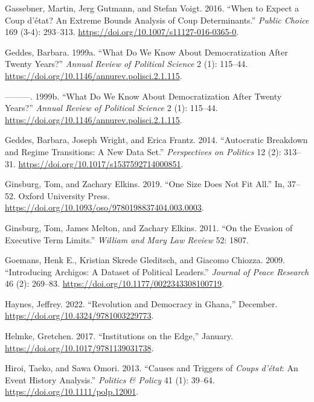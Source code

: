 \documentclass[
  12pt,
]{report}
\newlength{\cslhangindent}
\newenvironment{CSLReferences}[2] %
 {\begin{list}{}{%
  \setlength{\itemindent}{0pt}
  \setlength{\leftmargin}{0pt}
  \setlength{\parsep}{0pt}
  \ifodd #1
   \setlength{\leftmargin}{\cslhangindent}
   \setlength{\itemindent}{-1\cslhangindent}
  \fi
  \setlength{\itemsep}{#2\baselineskip}}}
 {\end{list}}
\begin{document}
\begin{CSLReferences}{1}{0}
Gassebner, Martin, Jerg Gutmann, and Stefan Voigt. 2016. {``When to
Expect a Coup d{'}état? An Extreme Bounds Analysis of Coup
Determinants.''} \emph{Public Choice} 169 (3-4): 293--313.
\url{https://doi.org/10.1007/s11127-016-0365-0}.

Geddes, Barbara. 1999a. {``What Do We Know About Democratization After
Twenty Years?''} \emph{Annual Review of Political Science} 2 (1):
115--44. \url{https://doi.org/10.1146/annurev.polisci.2.1.115}.

---------. 1999b. {``What Do We Know About Democratization After Twenty
Years?''} \emph{Annual Review of Political Science} 2 (1): 115--44.
\url{https://doi.org/10.1146/annurev.polisci.2.1.115}.

Geddes, Barbara, Joseph Wright, and Erica Frantz. 2014. {``Autocratic
Breakdown and Regime Transitions: A New Data Set.''} \emph{Perspectives
on Politics} 12 (2): 313--31.
\url{https://doi.org/10.1017/s1537592714000851}.

Ginsburg, Tom, and Zachary Elkins. 2019. {``One Size Does Not Fit
All.''} In, 37--52. Oxford University Press.
\url{https://doi.org/10.1093/oso/9780198837404.003.0003}.

Ginsburg, Tom, James Melton, and Zachary Elkins. 2011. {``On the Evasion
of Executive Term Limits.''} \emph{William and Mary Law Review} 52:
1807.

Goemans, Henk E., Kristian Skrede Gleditsch, and Giacomo Chiozza. 2009.
{``Introducing Archigos: A Dataset of Political Leaders.''}
\emph{Journal of Peace Research} 46 (2): 269--83.
\url{https://doi.org/10.1177/0022343308100719}.

Haynes, Jeffrey. 2022. {``Revolution and Democracy in Ghana,''}
December. \url{https://doi.org/10.4324/9781003229773}.

Helmke, Gretchen. 2017. {``Institutions on the Edge,''} January.
\url{https://doi.org/10.1017/9781139031738}.

Hiroi, Taeko, and Sawa Omori. 2013. {``Causes and Triggers of
{\emph{Coups d'état}}: An Event History Analysis.''} \emph{Politics \&
Policy} 41 (1): 39--64. \url{https://doi.org/10.1111/polp.12001}.


\end{CSLReferences}
\end{document}
